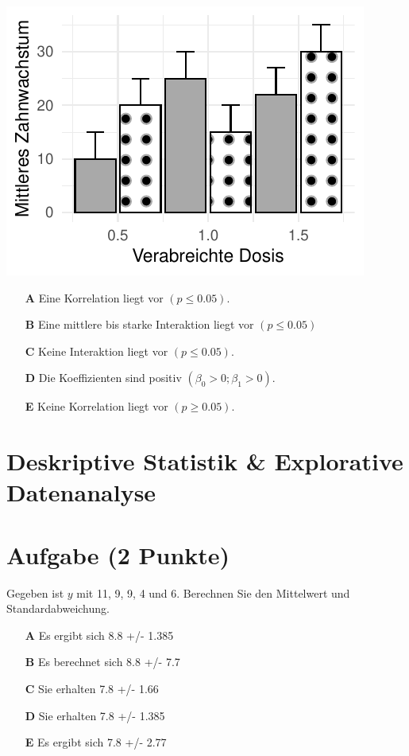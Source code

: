 \documentclass[a4paper, 9pt]{scrartcl}\usepackage[]{graphicx}\usepackage[]{xcolor}
\makeatletter
\def\maxwidth{ %
  \ifdim\Gin@nat@width>\linewidth
    \linewidth
  \else
    \Gin@nat@width
  \fi
}
\makeatother
\begin{document}
{\centering \includegraphics[width=\maxwidth]{img/mc-anova-02-a-1} 

}







\begin{enumerate}
\item [\textbf{A} \msquare] Eine Korrelation liegt vor $(p \leq 0.05)$.
\item [\textbf{B} \msquare] Eine mittlere bis starke Interaktion liegt vor $(p \leq 0.05)$
\item [\textbf{C} \msquare] Keine Interaktion liegt vor $(p \leq 0.05)$.
\item [\textbf{D} \msquare] Die Koeffizienten sind positiv $(\beta_0 > 0; \beta_1 > 0)$.
\item [\textbf{E} \msquare] Keine Korrelation liegt vor $(p \geq 0.05)$.
\end{enumerate} 
\section*{Deskriptive Statistik \& Explorative Datenanalyse}

\section{Aufgabe \hfill (2 Punkte)}




Gegeben ist $y$ mit 11, 9, 9, 4 und 6. Berechnen Sie den Mittelwert und Standardabweichung.



\begin{enumerate}
\item [\textbf{A} \msquare] Es ergibt sich 8.8 +/- 1.385
\item [\textbf{B} \msquare] Es berechnet sich 8.8 +/- 7.7
\item [\textbf{C} \msquare] Sie erhalten 7.8 +/- 1.66
\item [\textbf{D} \msquare] Sie erhalten 7.8 +/- 1.385
\item [\textbf{E} \msquare] Es ergibt sich 7.8 +/- 2.77
\end{enumerate} 
\end{document}
